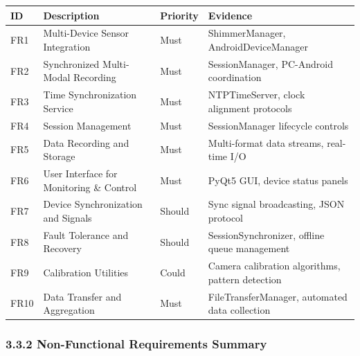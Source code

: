 \documentclass[12pt,a4paper]{article}
\begin{document}
\begin{longtable}[]{@{}
  >{\raggedright\arraybackslash}p{}
  >{\raggedright\arraybackslash}p{}
  >{\raggedright\arraybackslash}p{}
  >{\raggedright\arraybackslash}p{}@{}}
\toprule\noalign{}
\begin{minipage}[b]{\linewidth}\raggedright
ID
\end{minipage} & \begin{minipage}[b]{\linewidth}\raggedright
Description
\end{minipage} & \begin{minipage}[b]{\linewidth}\raggedright
Priority
\end{minipage} & \begin{minipage}[b]{\linewidth}\raggedright
Evidence
\end{minipage} \\
\midrule\noalign{}
\endhead
\bottomrule\noalign{}
\endlastfoot
FR1 & Multi-Device Sensor Integration & Must & ShimmerManager, AndroidDeviceManager \\
FR2 & Synchronized Multi-Modal Recording & Must & SessionManager, PC-Android coordination \\
FR3 & Time Synchronization Service & Must & NTPTimeServer, clock alignment protocols \\
FR4 & Session Management & Must & SessionManager lifecycle controls \\
FR5 & Data Recording and Storage & Must & Multi-format data streams, real-time I/O \\
FR6 & User Interface for Monitoring \& Control & Must & PyQt5 GUI, device status panels \\
FR7 & Device Synchronization and Signals & Should & Sync signal broadcasting, JSON protocol \\
FR8 & Fault Tolerance and Recovery & Should & SessionSynchronizer, offline queue management \\
FR9 & Calibration Utilities & Could & Camera calibration algorithms, pattern detection \\
FR10 & Data Transfer and Aggregation & Must & FileTransferManager, automated data collection \\
\end{longtable}

\subsubsection{3.3.2 Non-Functional Requirements Summary}\label{non-functional-requirements-summary}
\end{document}
